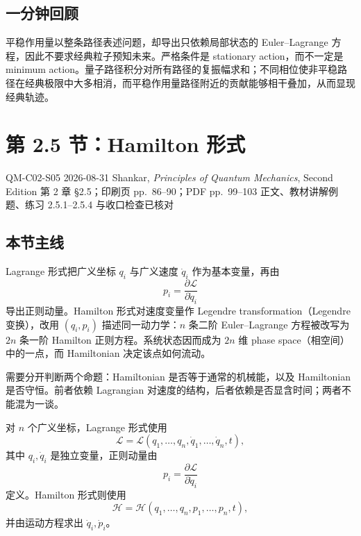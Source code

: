 \subsection{一分钟回顾}

平稳作用量以整条路径表述问题，却导出只依赖局部状态的 Euler--Lagrange 方程，因此不要求经典粒子预知未来。严格条件是 stationary action，而不一定是 minimum action。量子路径积分对所有路径的复振幅求和；不同相位使非平稳路径在经典极限中大多相消，而平稳作用量路径附近的贡献能够相干叠加，从而显现经典轨迹。

\section{第 2.5 节：Hamilton 形式}
\label{section:QM-C02-S05}

\studymeta
  {QM-C02-S05}
  {2026-08-31}
  {Shankar, \textit{Principles of Quantum Mechanics}, Second Edition}
  {第 2 章 \S 2.5；印刷页 pp.~86--90；PDF pp.~99--103}
  {正文、教材讲解例题、练习 2.5.1--2.5.4 与收口检查已核对}

\subsection{本节主线}

Lagrange 形式把广义坐标 $q_i$ 与广义速度 $\dot q_i$ 作为基本变量，再由
\[
  p_i=\frac{\partial\mathcal L}{\partial\dot q_i}
\]
导出正则动量。Hamilton 形式对速度变量作 Legendre transformation（Legendre 变换），改用 $(q_i,p_i)$ 描述同一动力学：$n$ 条二阶 Euler--Lagrange 方程被改写为 $2n$ 条一阶 Hamilton 正则方程。系统状态因而成为 $2n$ 维 phase space（相空间）中的一点，而 Hamiltonian 决定该点如何流动。

需要分开判断两个命题：Hamiltonian 是否等于通常的机械能，以及 Hamiltonian 是否守恒。前者依赖 Lagrangian 对速度的结构，后者依赖是否显含时间；两者不能混为一谈。


对 $n$ 个广义坐标，Lagrange 形式使用
\begin{equation}
  \mathcal L=\mathcal L(q_1,\ldots,q_n,
  \dot q_1,\ldots,\dot q_n,t),
  \label{eq:QM-C02-S05-lagrangian-variables}
\end{equation}
其中 $q_i,\dot q_i$ 是独立变量，正则动量由
\begin{equation}
  p_i=\frac{\partial\mathcal L}{\partial\dot q_i}
  \label{eq:QM-C02-S05-canonical-momentum}
\end{equation}
定义。Hamilton 形式则使用
\begin{equation}
  \mathcal H=\mathcal H(q_1,\ldots,q_n,p_1,\ldots,p_n,t),
  \label{eq:QM-C02-S05-hamiltonian-variables}
\end{equation}
并由运动方程求出 $\dot q_i,\dot p_i$。

